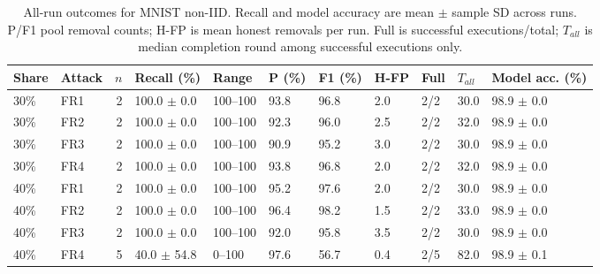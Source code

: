 \documentclass[conference]{IEEEtran}
\begin{document}
\begin{table}[t]\centering\scriptsize
\setlength{\tabcolsep}{3.5pt}
\caption{All-run outcomes for MNIST non-IID. Recall and model accuracy are mean $\pm$ sample SD across runs. P/F1 pool removal counts; H-FP is mean honest removals per run. Full is successful executions/total; $T_{all}$ is median completion round among successful executions only.}
\begin{tabular}{llrllllllll}\toprule
Share & Attack & $n$ & Recall (\%) & Range & P (\%) & F1 (\%) & H-FP & Full & $T_{all}$ & Model acc. (\%) \\\midrule
30\% & FR1 & 2 & 100.0 $\pm$ 0.0 & 100--100 & 93.8 & 96.8 & 2.0 & 2/2 & 30.0 & 98.9 $\pm$ 0.0 \\
30\% & FR2 & 2 & 100.0 $\pm$ 0.0 & 100--100 & 92.3 & 96.0 & 2.5 & 2/2 & 32.0 & 98.9 $\pm$ 0.0 \\
30\% & FR3 & 2 & 100.0 $\pm$ 0.0 & 100--100 & 90.9 & 95.2 & 3.0 & 2/2 & 30.0 & 98.9 $\pm$ 0.0 \\
30\% & FR4 & 2 & 100.0 $\pm$ 0.0 & 100--100 & 93.8 & 96.8 & 2.0 & 2/2 & 32.0 & 98.9 $\pm$ 0.0 \\
40\% & FR1 & 2 & 100.0 $\pm$ 0.0 & 100--100 & 95.2 & 97.6 & 2.0 & 2/2 & 30.0 & 98.9 $\pm$ 0.0 \\
40\% & FR2 & 2 & 100.0 $\pm$ 0.0 & 100--100 & 96.4 & 98.2 & 1.5 & 2/2 & 33.0 & 98.9 $\pm$ 0.0 \\
40\% & FR3 & 2 & 100.0 $\pm$ 0.0 & 100--100 & 92.0 & 95.8 & 3.5 & 2/2 & 30.0 & 98.9 $\pm$ 0.0 \\
40\% & FR4 & 5 & 40.0 $\pm$ 54.8 & 0--100 & 97.6 & 56.7 & 0.4 & 2/5 & 82.0 & 98.9 $\pm$ 0.1 \\
\bottomrule\end{tabular}\end{table}
\end{document}
